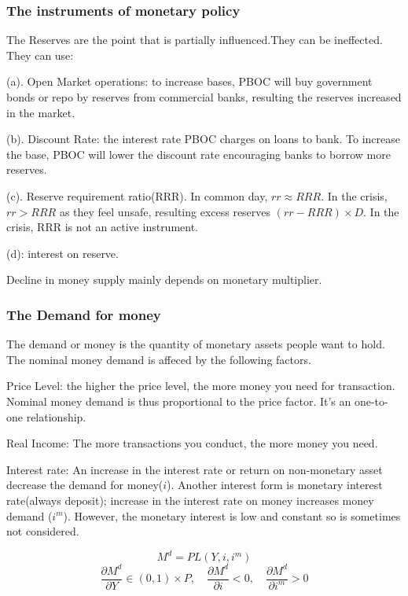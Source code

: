 \documentclass[10pt, a4paper]{article}
\begin{document}
    \subsubsection{The instruments of monetary policy}
        The Reserves are the point that is partially influenced.They can be ineffected. They can use:
        
        (a). Open Market operations: to increase bases, PBOC will buy government bonds or repo by reserves from commercial banks, resulting the reserves increased in the market. 
        
        (b). Discount Rate: the interest rate PBOC charges on loans to bank. To increase the base, PBOC will lower the discount rate encouraging banks to borrow more reserves. 

        (c). Reserve requirement ratio(RRR). In common day, $rr \approx RRR$. In the crisis, $rr > RRR$ as they feel unsafe, resulting excess reserves $(rr - RRR) \times D$. In the crisis, RRR is not an active instrument.
        
        (d): interest on reserve.

        Decline in money supply mainly depends on monetary multiplier.
    \subsubsection{The Demand for money}
        The demand or money is the quantity of monetary assets people want to hold. The nominal money demand is affeced by the following factors. 

        Price Level: the higher the price level, the more money you need for transaction. Nominal money  demand is thus proportional to the price factor. It's an one-to-one relationship. 

        Real Income: The more transactions you conduct, the more money you need.

        Interest rate: An increase in the interest rate or return on non-monetary asset decrease the demand for money($i$). Another interest form is monetary interest rate(always deposit); increase in the interest rate on money increases money demand ($i^m$). However, the monetary interest is low and constant so is sometimes not considered. 
        
        $$M^d = PL(Y, i, i^m)$$ 
        $$\frac{\partial M^d}{\partial Y} \in (0, 1) \times P, \quad\frac{\partial M^d}{\partial i} < 0, \quad\frac{\partial M^d}{\partial i^m} > 0$$
            
        
\end{document}
